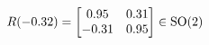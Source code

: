 \documentclass[preview]{standalone}
\begin{document}
\begin{align*}
\special{dvisvgm:raw <g id='unique000'>}R(-0.32) = \begin{bmatrix} 0.95 & 0.31 \\ -0.31 & 0.95 \end{bmatrix} \in \text{SO}(2)\special{dvisvgm:raw </g>}
\end{align*}
\end{document}
